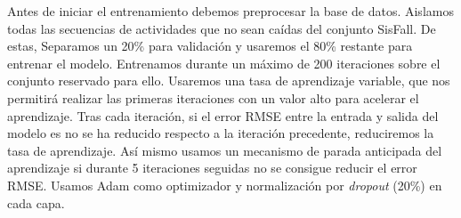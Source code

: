 Antes de iniciar el entrenamiento debemos preprocesar la base de datos. Aislamos todas las secuencias de actividades que no sean caídas del conjunto SisFall. De estas, Separamos un 20\% para validación y usaremos el 80\% restante para entrenar el modelo. Entrenamos durante un máximo de 200 iteraciones sobre el conjunto reservado para ello. Usaremos una tasa de aprendizaje variable, que nos permitirá realizar las primeras iteraciones con un valor alto para acelerar el aprendizaje. Tras cada iteración, si el error RMSE entre la entrada y salida del modelo es no se ha reducido respecto a la iteración precedente, reduciremos la tasa de aprendizaje. Así mismo usamos un mecanismo de parada anticipada del aprendizaje si durante 5 iteraciones seguidas no se consigue reducir el error RMSE. Usamos Adam como optimizador y normalización por \textit{dropout} (20\%) en cada capa. 


